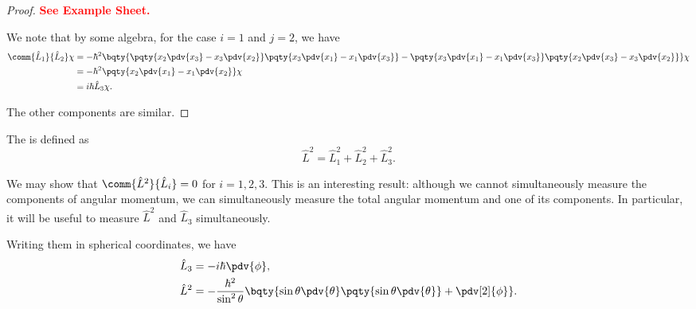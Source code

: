 \begin{proof}
    \textbf{\textcolor{red}{See Example Sheet.}}

    We note that by some algebra, for the case \(i = 1\) and \(j = 2\), we have
    \begin{subequations}
        \begin{align}
            \comm{\hat{L}_1}{\hat{L}_2} \chi &= - \hbar^2 \bqty{\pqty{x_2 \pdv{x_3} - x_3 \pdv{x_2}}\pqty{x_3 \pdv{x_1} - x_1 \pdv{x_3}} - \pqty{x_3 \pdv{x_1} - x_1 \pdv{x_3}}\pqty{x_2 \pdv{x_3} - x_3 \pdv{x_2}}}\chi\\
            &= - \hbar^2 \pqty{x_2 \pdv{x_1} - x_1 \pdv{x_2}} \chi \\
            &= i \hbar \hat{L}_3 \chi.
        \end{align}
    \end{subequations}

    The other components are similar.
\end{proof}

\begin{definition}
    The  is defined as
    \begin{equation}
        \hat{L}^2 = \hat{L}_1^2 + \hat{L}_2^2 + \hat{L}_3^2.
    \end{equation}
\end{definition}

We may show that \(\comm{\hat{L}^2}{\hat{L}_i} = 0\) for \(i = 1,2,3\). This is an interesting result: although we cannot simultaneously measure the components of angular momentum, we can simultaneously measure the total angular momentum and one of its components. In particular, it will be useful to measure \(\hat{L}^2\) and \(\hat{L}_3\) simultaneously.

Writing them in spherical coordinates, we have
\begin{subequations}
    \begin{align}
        \hat{L}_3 &= - i \hbar \pdv{\phi},\\
        \hat{L}^2 &= - \frac{\hbar^2}{\sin^2 \theta} \bqty{\sin \theta \pdv{\theta} \pqty{\sin \theta \pdv{\theta}} + \pdv[2]{\phi}}.
    \end{align}
\end{subequations}